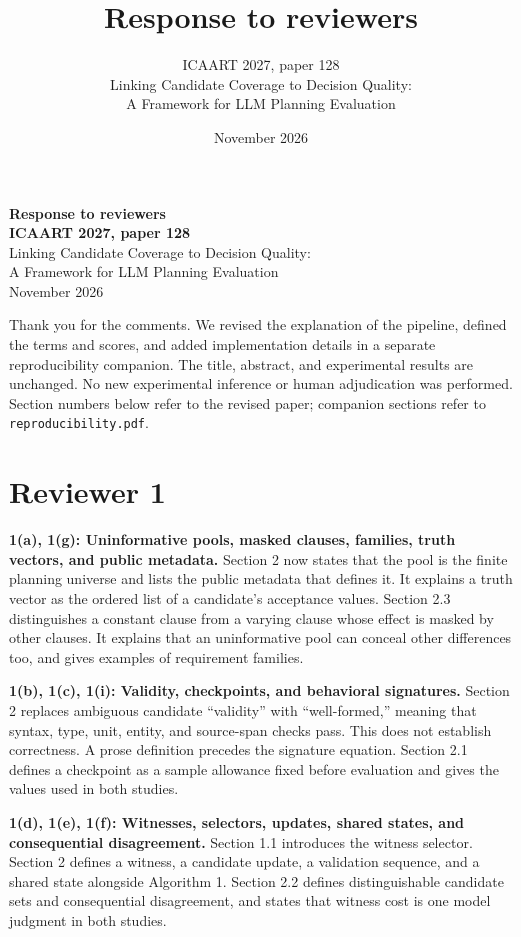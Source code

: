 \documentclass[11pt,a4paper]{scrartcl}
\title{Response to reviewers}
\subtitle{ICAART 2027, paper 128\\Linking Candidate Coverage to Decision Quality:\\A Framework for LLM Planning Evaluation}
\author{}
\date{November 2026}
\begin{document}
\begin{center}
{\Large\sffamily\bfseries Response to reviewers}\\[0.5em]
{\bfseries ICAART 2027, paper 128}\\
Linking Candidate Coverage to Decision Quality:\\
A Framework for LLM Planning Evaluation\\[0.4em]
November 2026
\end{center}

Thank you for the comments. We revised the explanation of the pipeline, defined the terms and scores, and added implementation details in a separate reproducibility companion. The title, abstract, and experimental results are unchanged. No new experimental inference or human adjudication was performed. Section numbers below refer to the revised paper; companion sections refer to \texttt{reproducibility.pdf}.

\section*{Reviewer 1}

\textbf{1(a), 1(g): Uninformative pools, masked clauses, families, truth vectors, and public metadata.}
Section 2 now states that the pool is the finite planning universe and lists the public metadata that defines it. It explains a truth vector as the ordered list of a candidate's acceptance values. Section 2.3 distinguishes a constant clause from a varying clause whose effect is masked by other clauses. It explains that an uninformative pool can conceal other differences too, and gives examples of requirement families.

\textbf{1(b), 1(c), 1(i): Validity, checkpoints, and behavioral signatures.}
Section 2 replaces ambiguous candidate ``validity'' with ``well-formed,'' meaning that syntax, type, unit, entity, and source-span checks pass. This does not establish correctness. A prose definition precedes the signature equation. Section 2.1 defines a checkpoint as a sample allowance fixed before evaluation and gives the values used in both studies.

\textbf{1(d), 1(e), 1(f): Witnesses, selectors, updates, shared states, and consequential disagreement.}
Section 1.1 introduces the witness selector. Section 2 defines a witness, a candidate update, a validation sequence, and a shared state alongside Algorithm 1. Section 2.2 defines distinguishable candidate sets and consequential disagreement, and states that witness cost is one model judgment in both studies.
\end{document}
